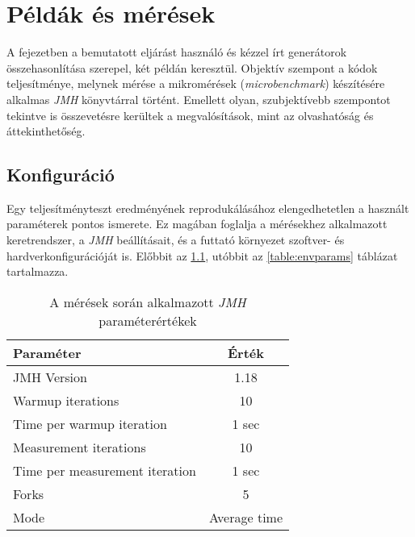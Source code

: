 \chapter{Példák és mérések}

A fejezetben a bemutatott eljárást használó és kézzel írt generátorok összehasonlítása szerepel, két példán keresztül. Objektív szempont a kódok teljesítménye, melynek mérése a mikromérések (\textit{microbenchmark}) készítésére alkalmas \textit{JMH} könyvtárral történt. Emellett olyan, szubjektívebb szempontot tekintve is összevetésre kerültek a megvalósítások, mint az olvashatóság és áttekinthetőség.

\section{Konfiguráció}

Egy teljesítményteszt eredményének reprodukálásához elengedhetetlen a használt paraméterek pontos ismerete. Ez magában foglalja a mérésekhez alkalmazott keretrendszer, a \textit{JMH} beállításait, és a futtató környezet szoftver- és hardverkonfigurációját is. Előbbit az \ref{table:jmhparams}, utóbbit az \ref{table:envparams} táblázat tartalmazza.

\begin{table}[h]
\captionsetup{justification=centering}
\centering
  \begin{tabular}{|| l | c ||}
  \hline
  Paraméter & Érték \\
  \hline \hline
  JMH Version                        & 1.18 \\
  \hline
  Warmup iterations                  & 10 \\
  Time per warmup iteration          & 1 sec \\
  \hline
  Measurement iterations             & 10 \\
  Time per measurement iteration     & 1 sec \\
  \hline
  Forks                              & 5 \\
  \hline                               
  Mode                               & Average time \\
  \hline
  \end{tabular}
\caption{A mérések során alkalmazott \textit{JMH} paraméterértékek}  
\label{table:jmhparams}
\end{table}

